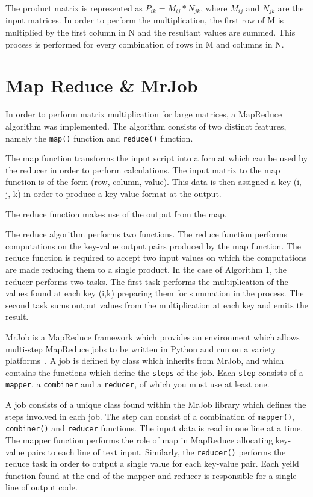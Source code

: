 \documentclass[10pt,twocolumn]{witseiepaper}
\begin{document}
The product matrix is represented as $P_{ik} = M_{ij} * N_{jk}$, where $M_{ij}$ and $N_{jk}$ are the input matrices. In order to perform the multiplication, the first row of M is multiplied by the first column in N and the resultant values are summed. This process is performed for every combination of rows in M and columns in N. 

\section{Map Reduce \& MrJob}

In order to perform matrix multiplication for large matrices, a MapReduce algorithm was implemented. The algorithm consists of two distinct features, namely the \verb|map()| function and \verb|reduce()| function. 

The map function transforms the input script into a format which can be used by the reducer in order to perform calculations. The input matrix to the map function is of the form (row, column, value). This data is then assigned a key (i, j, k) in order to produce a key-value format at the output.

The reduce function makes use of the output from the map. 

The reduce algorithm performs two functions. The reduce function performs computations on the key-value output pairs produced by the map function. The reduce function is required to accept two input values on which the computations are made reducing them to a single product. In the case of Algorithm 1, the reducer performs two tasks. The first task performs the multiplication of the values found at each key (i,k) preparing them for summation in the process. The second task sums output values from the multiplication at each key and emits the result.

MrJob is a MapReduce framework which provides an environment which allows multi-step MapReduce jobs to be written in Python and run on a variety platforms~\cite{mrjob}. A job is defined by class which inherits from MrJob, and which contains the functions which define the \texttt{steps} of the job. Each \texttt{step} consists of a \texttt{mapper}, a \texttt{combiner} and a \texttt{reducer}, of which you must use at least one.

A job consists of a unique class found within the MrJob library which defines the steps involved in each job. The step can  consist of a combination of \verb|mapper()|, \verb|combiner()| and \verb|reducer| functions. The input data is read in one line at a time. The mapper function performs the role of map in MapReduce allocating key-value pairs to each line of text input. Similarly, the \verb|reducer()| performs the reduce task in order to output a single value for each key-value pair.  Each yeild function found at the end of the mapper and reducer is responsible for a single line of output code.
\end{document}
